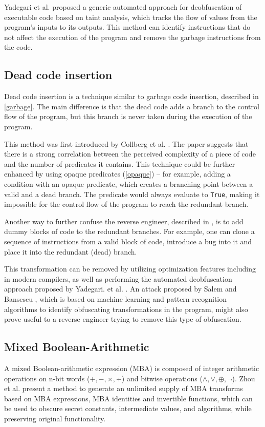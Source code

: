 \documentclass[
  digital, %
  table,   %
  twoside, %
  nolof,     %
  nolot,     %
]{fithesis3}
\theoremstyle{definition}
\begin{document}
Yadegari et al. \cite{generic_deobfuscation} proposed a generic automated approach for deobfuscation of executable code based on taint analysis, which tracks the flow of values from the program's inputs to its outputs. This method can identify instructions that do not affect the execution of the program and remove the garbage instructions from the code. 

\subsection{Dead code insertion} \label{dead}
Dead code insertion is a technique similar to garbage code insertion, described in \ref{garbage}. The main difference is that the dead code adds a branch to the control flow of the program, but this branch is never taken during the execution of the program. 

This method was first introduced by Collberg et al. \cite{taxonomy_obf}. The paper suggests that there is a strong correlation between the perceived complexity of a piece of code and the number of predicates it contains. This technique could be further enhanced by using opaque predicates (\ref{opaque}) -- for example, adding a condition with an opaque predicate, which creates a branching point between a valid and a dead branch. The predicate would always evaluate to \texttt{True}, making it impossible for the control flow of the program to reach the redundant branch. 

Another way to further confuse the reverse engineer, described in \cite{taxonomy_obf}, is to add dummy blocks of code to the redundant branches. For example, one can clone a sequence of instructions from a valid block of code, introduce a bug into it and place it into the redundant (dead) branch. 

This transformation can be removed by utilizing optimization features including in modern compilers, as well as performing the automated deobfuscation approach proposed by Yadegari. et al. \cite{generic_deobfuscation}. An attack proposed by Salem and Bansescu \cite{ml_deobfuscation}, which is based on machine learning and pattern recognition algorithms to identify obfuscating transformations in the program, might also prove useful to a reverse engineer trying to remove this type of obfuscation. 

\subsection{Mixed Boolean-Arithmetic} \label{mba}
A mixed Boolean-arithmetic expression (MBA) is composed of integer arithmetic operations on n-bit words ($+,-,\times, \div$) and bitwise operations ($\wedge, \vee, \oplus, \neg$). Zhou et al. \cite{mba_zhou} present a method to generate an unlimited supply of MBA transforms based on MBA expressions, MBA identities and invertible functions, which can be used to obscure secret constants, intermediate values, and algorithms, while preserving original functionality. %
\end{document}
